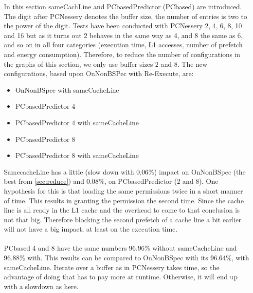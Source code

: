 In this section sameCachLine and PCbasedPredictor (PCbased) are introduced. The digit after PCNessery denotes the buffer size, the number of entries is two to the power of the digit. Tests have been conducted with PCNessery 2, 4, 6, 8, 10 and 16 but as it turns out 2 behaves in the same way as 4, and 8 the same as 6, and so on in all four categories (execution time, L1 accesses, number of prefetch and energy consumption). Therefore, to reduce the number of configurations in the graphs of this section, we only use buffer sizes 2 and 8. The new configurations, based upon OnNonBSPec with Re-Execute, are:
\begin{itemize}
    \item OnNonBSpec with sameCacheLine
    \item PCbasedPredictor 4
    \item PCbasedPredictor 4 with sameCacheLine
    \item PCbasedPredictor 8
    \item PCbasedPredictor 8 with sameCacheLine
\end{itemize}
\resExtime
{}
SamecacheLine has a little (slow down with 0,06\%) impact on OnNonBSpec (the best from \ref{sec:reduce}) and 0.08\%, on PCbasedPredictor (2 and 8). One hypothesis for this is that loading the same permissions twice in a short manner of time. This results in granting the permission the second time. Since the cache line is all ready in the L1 cache and the overhead to come to that conclusion is not that big. Therefore blocking the second prefetch of a cache line a bit earlier will not have a big impact, at least on the execution time. 
\\ \\ 
PCbased 4 and 8 have the same numbers 96.96\% without sameCacheLine and 96.88\% with. This results can be compared to OnNonBSpec with its 96.64\%, with sameCacheLine. Iterate over a buffer as in PCNessery takes time, so the advantage of doing that has to pay more at runtime. Otherwise, it will end up with a slowdown as here. 

